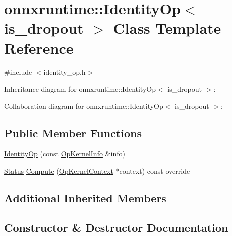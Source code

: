 \hypertarget{classonnxruntime_1_1IdentityOp}{}\section{onnxruntime\+:\+:Identity\+Op$<$ is\+\_\+dropout $>$ Class Template Reference}
\label{classonnxruntime_1_1IdentityOp}


{\ttfamily \#include $<$identity\+\_\+op.\+h$>$}



Inheritance diagram for onnxruntime\+:\+:Identity\+Op$<$ is\+\_\+dropout $>$\+:


Collaboration diagram for onnxruntime\+:\+:Identity\+Op$<$ is\+\_\+dropout $>$\+:
\subsection*{Public Member Functions}
\begin{DoxyCompactItemize}
\item 
\mbox{\hyperlink{classonnxruntime_1_1IdentityOp_a6d26d00cf160e05041446ceddb9970aa}{Identity\+Op}} (const \mbox{\hyperlink{classonnxruntime_1_1OpKernelInfo}{Op\+Kernel\+Info}} \&info)
\item 
\mbox{\hyperlink{classonnxruntime_1_1common_1_1Status}{Status}} \mbox{\hyperlink{classonnxruntime_1_1IdentityOp_a2eac9bf7e0bc95300097a840ecc46006}{Compute}} (\mbox{\hyperlink{classonnxruntime_1_1OpKernelContext}{Op\+Kernel\+Context}} $\ast$context) const override
\end{DoxyCompactItemize}
\subsection*{Additional Inherited Members}


\subsection{Constructor \& Destructor Documentation}
\mbox{\label{classonnxruntime_1_1IdentityOp_a6d26d00cf160e05041446ceddb9970aa}} 
